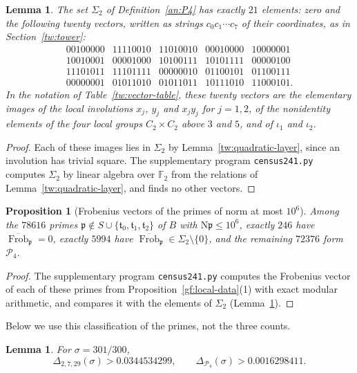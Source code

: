 \documentclass[11pt]{amsart}
\numberwithin{equation}{section}
\newtheorem{proposition}[equation]{Proposition}
\newtheorem{lemma}[equation]{Lemma}
\theoremstyle{definition}
\theoremstyle{remark}
\DeclareMathOperator{\Frob}{Frob}
\newcommand{\Ftwo}{\mathbb F_2}
\begin{document}
\begin{lemma}\label{an:sigma2}
The set $\Sigma_2$ of Definition~\ref{an:P4} has exactly $21$ elements: zero
and the following twenty vectors, written as strings $c_0c_1\cdots c_7$ of
their coordinates, as in Section~\ref{tw:tower}:
\[
\begin{array}{ccccc}
 00100000&11110010&11010010&00010000&10000001\\
 10010001&00001000&10100111&10101111&00000100\\
 11101011&11101111&00000010&01100101&01100111\\
 00000001&01011010&01011011&10111010&11000101.
\end{array}
\]
In the notation of Table~\ref{tw:vector-table}, these twenty vectors are the
elementary images of the local involutions $x_j$, $y_j$ and $x_jy_j$ for
$j=1,2$, of the nonidentity elements of the four local groups
$C_2\times C_2$ above $3$ and $5$, and of $\iota_1$ and $\iota_2$.
\end{lemma}

\begin{proof}
Each of these images lies in $\Sigma_2$ by Lemma~\ref{tw:quadratic-layer},
since an involution has trivial square. The supplementary program
\texttt{census241.py} computes $\Sigma_2$ by linear algebra over $\Ftwo$
from the relations of Lemma~\ref{tw:quadratic-layer}, and finds no other
vectors.
\end{proof}

\begin{proposition}[Frobenius vectors of the primes of norm at most $10^6$]\label{an:census-prop}
Among the $78616$ primes
$\mathfrak p\notin S\cup\{\mathfrak t_0,\mathfrak t_1,\mathfrak t_2\}$ of
$B$ with $\mathrm N\mathfrak p\le10^6$, exactly $246$ have
$\overline{\Frob}_{\mathfrak p}=0$, exactly $5994$ have
$\overline{\Frob}_{\mathfrak p}\in\Sigma_2\setminus\{0\}$, and the remaining $72376$ form
$\mathcal P_4$.
\end{proposition}

\begin{proof}
The supplementary program \texttt{census241.py} computes the Frobenius
vector of each of these primes from Proposition~\ref{gf:local-data}(1) with
exact modular arithmetic, and compares it with the elements of $\Sigma_2$
(Lemma~\ref{an:sigma2}).
\end{proof}

Below we use this classification of the primes, not the three counts.

\begin{lemma}\label{an:corrections}
For $\sigma=301/300$,
\begin{equation}\label{an:census-values}
 \Delta_{2,7,29}(\sigma)>0.0344534299,\qquad
 \Delta_{\mathcal P_4}(\sigma)>0.0016298411.
\end{equation}
\end{lemma}
\end{document}

